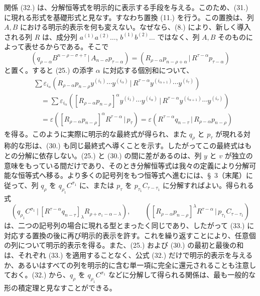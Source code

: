 \documentclass[11pt]{jlreq}
\newcommand{\pair}[2]{(#1\,|\,#2)}
\newcommand{\eps}{\varepsilon}
\begin{document}
関係 (32.) は、分解恒等式を明示的に表示する手段を与える。このため、(31.) に現れる形式を基礎形式と見なす。すなわち置換 (11.) を行う。この置換は、列 $A,B$ における明示的表示を何も変えない。なぜなら、(8.) により、新しく導入される列 $R$ は、成分列 $a^{(1)}a^{(2)}\ldots$, $b^{(1)}b^{(2)}\ldots$ ではなく、列 $A,B$ そのものによって表せるからである。そこで
\begin{equation}
 \pair{q_{\rho-\alpha}B^{n-\rho-\sigma+\tau}}{A_{n-\sigma}p_{\tau-\alpha}}
 =\pair{R_{\rho-\alpha}p_{n-\rho+\alpha}}{R^{\tau-\alpha}p_{\tau-\alpha}}
\tag{33}
\end{equation}
と置く。すると (25.) の添字 $\alpha$ に対応する個別和について、
\begin{equation}
\begin{aligned}
&\sum \eps_{i_\alpha}\pair{R_{\rho-\alpha}p_{n-\rho}y^{(i_1)}\cdots y^{(i_\alpha)}}{R^{\tau-\alpha}y^{(i_{\alpha+1})}\cdots y^{(i_\tau)}}\\
&\quad=\sum \eps_{i_\alpha}\pair{[R_{\rho-\alpha}p_{n-\rho}]^\alpha y^{(i_1)}\cdots y^{(i_\alpha)}}{R^{\tau-\alpha}y^{(i_{\alpha+1})}\cdots y^{(i_\tau)}}\\
&\quad=\eps\pair{[R_{\rho-\alpha}p_{n-\rho}]^\alpha R^{\tau-\alpha}}{p_\tau}
 =\eps\pair{R^{\tau-\alpha}q_{n-\tau}}{R_{\rho-\alpha}p_{n-\rho}}
\end{aligned}
\tag{34}
\end{equation}
を得る。このように実際に明示的な最終式が得られ、また $q_\rho$ と $p_\tau$ が現れる対称的な形は、(30.) も同じ最終式へ導くことを示す。したがってこの最終式はもとの分解に依存しない。(25.) と (30.) の間に差があるのは、列 $y$ と $v$ が独立の意味をもっている間だけであり、そのとき分解恒等式は我々の定義により分解可能な恒等式へ移る。より多くの記号列をもつ恒等式へ進むには、\S\ 3（末尾）に従って、列 $q_\rho$ を $q_{\rho_1}C^{\sigma_1}$ に、または $p_\tau$ を $p_{\tau_1}C_{\tau-\tau_1}$ に分解すればよい。得られる式
\begin{equation}
 \pair{q_{\rho_1}C^{\sigma_1}}{[R^{\tau-\alpha}q_{n-\tau}]_\lambda R_{\rho+\sigma_1-\alpha-\lambda}},
 \qquad
 \pair{[R_{\rho-\alpha}p_{n-\rho}]^\lambda R^{\tau-\alpha}}{p_{\tau_1}C_{\tau-\tau_1}}
\tag{35}
\end{equation}
は、二つの記号列の場合に現れる型とまったく同じであり、したがって (33.) に対応する置換の後に再び明示的表示を許す。これを繰り返すことにより、任意個の列について明示的表示を得る。また、(25.) および (30.) の最初と最後の和は、それぞれ (33.) を適用することなく、公式 (32.) だけで明示的表示を与えるか、あるいはすべての列を明示的に含む単一項に完全に還元されることも注意しておく。(32.) から、$q_\rho$ を $q_{\rho_1}C^{\sigma_1}$ などに分解して得られる関係は、最も一般的な形の積定理と見なすことができる。
\end{document}
